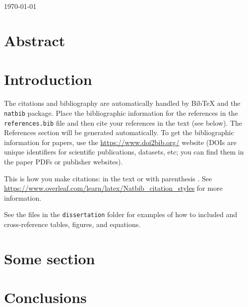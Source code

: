 \documentclass[11pt,a4paper,onecolumn,oneside]{article}
\begin{document}
\thispagestyle{empty}
\begin{center}
  {\LARGE \Title{}}
  \\[0.3cm]
  {\large \Name{}}
  \\[0.3cm]
  {\monthyear\today}
\end{center}


\section*{Abstract}

\lipsum[1]



\section{Introduction}

The citations and bibliography are automatically handled by
BibTeX and the \texttt{natbib} package. Place the bibliographic information for
the references in the \texttt{references.bib} file and then cite your
references in the text (see below). The References section will be generated
automatically. To get the bibliographic information for papers, use the
\url{https://www.doi2bib.org/} website (DOIs are unique identifiers for
scientific publications, datasets, etc; you can find them in the paper PDFs or
publisher websites).

This is how you make citations: in the text \cite{Parker1973} or with
parenthesis \citep{Parker1973}. See
\url{https://www.overleaf.com/learn/latex/Natbib_citation_styles} for more
information.

See the files in the \texttt{dissertation} folder for examples of how to
included and cross-reference tables, figures, and equations.


\section{Some section}

\lipsum


\section{Conclusions}

\lipsum[1-2]



\renewcommand{\bibname}{References}

\end{document}
